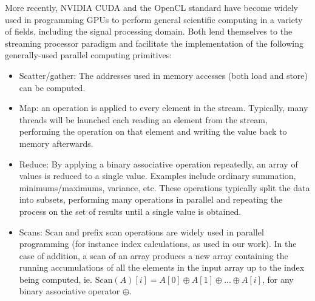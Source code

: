 More recently, NVIDIA CUDA \cite{cuda} and the OpenCL standard \cite{opencl} have become widely used in programming GPUs to perform general scientific computing in a variety of fields, including the signal 
processing domain. Both lend themselves to the streaming processor paradigm and facilitate the implementation
of the following generally-used parallel computing primitives:
\begin{itemize}
 \item Scatter/gather: The addresses used in memory accesses (both load and store) can be computed.
 \item Map: an operation is applied to every element in the stream. Typically, many threads will be launched
       each reading an element from the stream, performing the operation on that element and writing the value
       back to memory afterwards.
 \item Reduce: By applying a binary associative operation repeatedly, an array of values is reduced to a single value.
       Examples include ordinary summation, minimums/maximums, variance, etc. These operations typically split the data into
       subsets, performing many operations in parallel and repeating the process on the set of results until a single value is
       obtained. 
 \item Scans: Scan and prefix scan operations are widely used in parallel programming (for instance index calculations, as used
       in our work). In the case of addition, a scan of an array produces a new array containing the running accumulations of all the elements in the input
       array up to the index being computed, ie. $\text{Scan}(A)[i] = A[0] \oplus A[1] \oplus ... \oplus A[i]$, for any binary associative operator $\oplus$.
\end{itemize}

